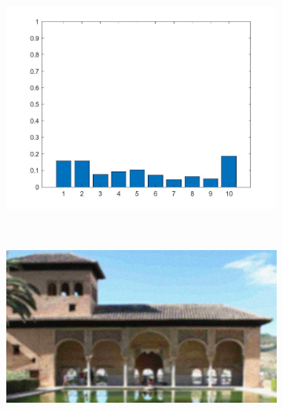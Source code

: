 \begin{figure}
\begin{subfigure}[b]{0.3\textwidth}
         \caption{}
         \label{}
     \end{subfigure}
     \hfill
     \begin{subfigure}[b]{0.3\textwidth}
         \centering
         \includegraphics[width=\textwidth]{./figs/wighted_histogram2}
         \caption{}
         \label{}
     \end{subfigure}
     \\
     \begin{subfigure}[b]{0.3\textwidth}
         \centering
         \includegraphics[width=\textwidth]{./figs/img234}
         \caption{}
         \label{}
     \end{subfigure}
     \hfill
     \begin{subfigure}[b]{0.3\textwidth}
         \centering

\end{subfigure}
\end{figure}
